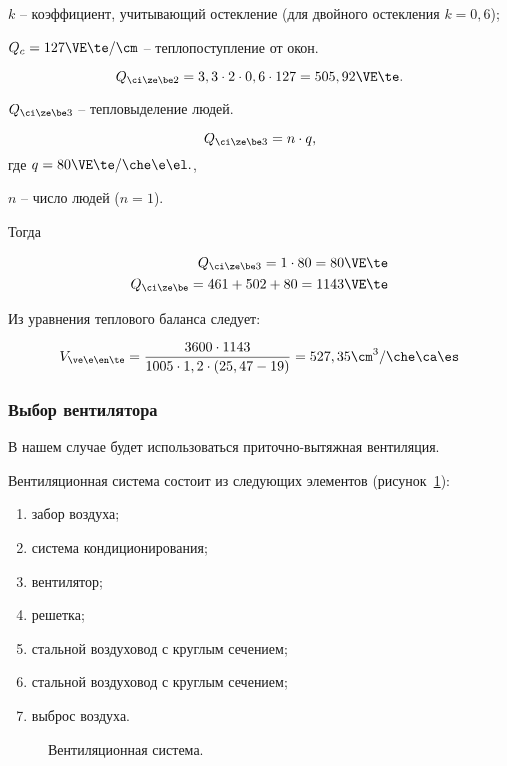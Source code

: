$k$ -- коэффициент, учитывающий остекление (для двойного остекления $k = 0,6$);

$Q_c = 127 \VE\te / \cm$ -- теплопоступление от окон.

\begin{equation*}
	Q_{\ci\ze\be2} = 3,3 \cdot 2 \cdot 0,6 \cdot 127 = 505,92 \VE\te.
\end{equation*}

$Q_{\ci\ze\be3}$ -- тепловыделение людей.

\begin{equation*}
	Q_{\ci\ze\be3} = n \cdot q,
\end{equation*}
где $q = 80 \VE\te / \che\e\el.$,

$n$ -- число людей ($n = 1$).

Тогда

\begin{eqnarray*}
	Q_{\ci\ze\be3} = 1 \cdot 80 = 80 \VE\te \\
	Q_{\ci\ze\be} = 461 + 502 + 80 = 1143 \VE\te
\end{eqnarray*}

Из уравнения теплового баланса следует:

\begin{equation*}
	V_{\ve\e\en\te} = \frac{3600 \cdot 1143}{1005 \cdot 1,2 \cdot (25,47 - 19)} = 527,35 \cm^3 / \che\ca\es
\end{equation*}

\subsubsection{Выбор вентилятора}
В нашем случае будет использоваться приточно-вытяжная вентиляция.

Вентиляционная система состоит из следующих элементов (рисунок~\ref{img:ventilation}): 
\begin{enumerate}
	\item забор воздуха;
	\item система кондиционирования;
	\item вентилятор;
	\item решетка;
	\item стальной воздуховод с круглым сечением;
	\item стальной воздуховод с круглым сечением;
	\item выброс воздуха.
\end{enumerate}

\begin{figure}[H]
    \caption{Вентиляционная система.}
    \label{img:ventilation}
\end{figure}


